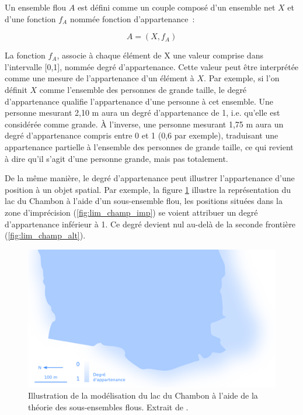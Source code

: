 Un ensemble flou $A$ est défini comme un couple composé d’un ensemble
net $X$ et d’une fonction $f_A$ nommée fonction d’appartenance :

\begin{equation}
  A = (X, f_A)  
\end{equation}

La fonction $f_A$, associe à chaque élément de X une valeur comprise
dans l’intervalle [0,1], nommée degré d’appartenance. Cette valeur
peut être interprétée comme une mesure de l’appartenance d’un élément
à $X$. Par exemple, si l’on définit $X$ comme l’ensemble des personnes
de grande taille, le degré d’appartenance qualifie l’appartenance
d’une personne à cet ensemble. Une personne mesurant 2,10 m aura un
degré d’appartenance de 1, i.e. qu’elle est considérée comme grande. À
l’inverse, une personne mesurant 1,75 m aura un degré d’appartenance
compris entre 0 et 1 (0,6 par exemple), traduisant une appartenance
partielle à l’ensemble des personnes de grande taille, ce qui revient
à dire qu’il s’agit d’une personne grande, mais pas totalement.

De la même manière, le degré d’appartenance peut illustrer
l’appartenance d’une position à un objet spatial. Par exemple, la
figure \ref{fig:champ_flou} illustre la représentation du lac du
Chambon à l’aide d’un sous-ensemble flou, les positions situées dans
la zone d’imprécision (\autoref{fig:lim_champ_imp}) se voient
attribuer un degré d’appartenance inférieur à 1. Ce degré devient nul
au-delà de la seconde frontière (\autoref{fig:lim_champ_alt}).

\begin{figure}
  \centering
  \includegraphics{../figures/fig6.png}
  \caption{Illustration de la modélisation du lac du Chambon à l’aide
    de la théorie des sous-ensembles flous. Extrait de
    \textcite{Bunel2020}.}
  \label{fig:champ_flou}
\end{figure}

